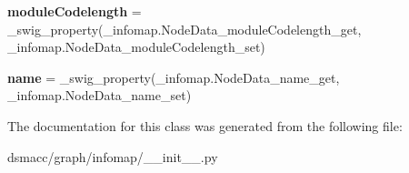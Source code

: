 \begin{DoxyCompactItemize}
\item 
\mbox{\label{classdsmacc_1_1graph_1_1infomap_1_1NodeData_a1016ae096df63ca8ca0feda0d5775fe0}} 
{\bfseries module\+Codelength} = \+\_\+swig\+\_\+property(\+\_\+infomap.\+Node\+Data\+\_\+module\+Codelength\+\_\+get, \+\_\+infomap.\+Node\+Data\+\_\+module\+Codelength\+\_\+set)
\item 
\mbox{\label{classdsmacc_1_1graph_1_1infomap_1_1NodeData_a9d314767a54980ddde43d4a877b4fc33}} 
{\bfseries name} = \+\_\+swig\+\_\+property(\+\_\+infomap.\+Node\+Data\+\_\+name\+\_\+get, \+\_\+infomap.\+Node\+Data\+\_\+name\+\_\+set)
\end{DoxyCompactItemize}


The documentation for this class was generated from the following file\+:\begin{DoxyCompactItemize}
\item 
dsmacc/graph/infomap/\+\_\+\+\_\+init\+\_\+\+\_\+.\+py\end{DoxyCompactItemize}
